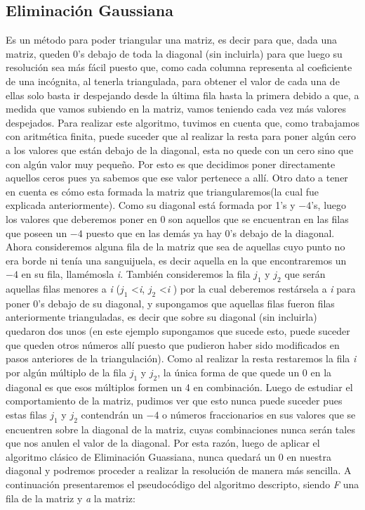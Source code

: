 \documentclass[10pt, a4paper]{article}
\begin{document}
\subsection{Eliminaci\'on Gaussiana}
 	Es un m\'etodo para poder triangular una matriz, es decir para que, dada una matriz, queden 0's debajo de toda la diagonal (sin incluirla) para que luego su resoluci\'on sea m\'as f\'acil puesto que, como cada columna representa al coeficiente de una inc\'ognita, al tenerla triangulada, para obtener el valor de cada una de ellas solo basta ir despejando desde la \'ultima fila hasta la primera debido a que, a medida que vamos subiendo en la matriz, vamos teniendo cada vez m\'as valores despejados. Para realizar este algoritmo, tuvimos en cuenta que, como trabajamos con aritm\'etica finita, puede suceder que al realizar la resta para poner alg\'un cero a los valores que est\'an debajo de la diagonal, esta no quede con un cero sino que con alg\'un valor muy pequeño. Por esto es que decidimos poner directamente aquellos ceros pues ya sabemos que ese valor pertenece a all\'i. Otro dato a tener en cuenta es c\'omo esta formada la matriz que triangularemos(la cual fue explicada anteriormente). Como su diagonal est\'a formada por 1's y $-4$'s, luego los valores que deberemos poner en 0 son aquellos que se encuentran en las filas que poseen un $-4$ puesto que en las dem\'as ya hay 0's debajo de la diagonal. Ahora consideremos alguna fila de la matriz que sea de aquellas cuyo punto no era borde ni ten\'ia una sanguijuela, es decir aquella en la que encontraremos un $-4$ en su fila, llam\'emosla \textit{i}. Tambi\'en consideremos la fila \textit{$j_{1}$} y \textit{$j_{2}$} que ser\'an aquellas filas menores a \textit{i} (\textit{$j_{1}$} \textless  \textit{i}, \textit{$j_{2}$}  \textless \textit{i} ) por la cual deberemos rest\'arsela a \textit{i} para poner 0's debajo de su diagonal, y supongamos que aquellas filas fueron filas anteriormente trianguladas, es decir que sobre su diagonal (sin incluirla) quedaron dos unos (en este ejemplo supongamos que sucede esto, puede suceder que queden otros n\'umeros all\'i puesto que pudieron haber sido modificados en pasos anteriores de la triangulaci\'on). Como al realizar la resta restaremos la fila \textit{i} por alg\'un m\'ultiplo de la fila \textit{$j_{1}$} y \textit{$j_{2}$}, la \'unica forma de que quede un 0 en la diagonal es que esos m\'ultiplos formen un 4 en combinaci\'on. Luego de estudiar el comportamiento de la matriz, pudimos ver que esto nunca puede suceder pues estas filas \textit{$j_{1}$} y \textit{$j_{2}$} contendr\'an un $-4$ o n\'umeros fraccionarios en sus valores que se encuentren sobre la diagonal de la matriz, cuyas combinaciones nunca ser\'an tales que nos anulen el valor de la diagonal.   Por esta raz\'on, luego de aplicar el algoritmo cl\'asico de Eliminaci\'on Guassiana, nunca quedar\'a un 0 en nuestra diagonal y podremos proceder a realizar la resoluci\'on de manera m\'as sencilla. A continuaci\'on presentaremos el pseudoc\'odigo del algoritmo descripto, siendo \textit{F} una fila de la matriz y \textit{a} la matriz:
\end{document}
